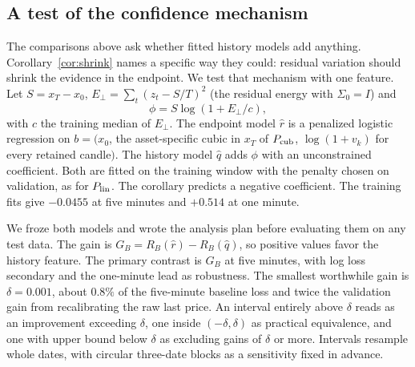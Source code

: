 \documentclass[runningheads]{llncs}
\begin{document}
\subsection{A test of the confidence mechanism}
\label{sec:confidence}
The comparisons above ask whether fitted history models add anything. Corollary~\ref{cor:shrink} names a specific way they could: residual variation should shrink the evidence in the endpoint. We test that mechanism with one feature. Let $S=x_T-x_0$, $E_\perp=\sum_t(z_t-S/T)^2$ (the residual energy with $\Sigma_0=I$) and
\[
 \phi=S\log(1+E_\perp/c),
\]
with $c$ the training median of $E_\perp$. The endpoint model $\widehat r$ is a penalized logistic regression on $b=(x_0$, the asset-specific cubic in $x_T$ of $P_{\rm cub}$, $\log(1+v_k)$ for every retained candle$)$. The history model $\widehat q$ adds $\phi$ with an unconstrained coefficient. Both are fitted on the training window with the penalty chosen on validation, as for $P_{\rm lin}$. The corollary predicts a negative coefficient. The training fits give $-0.0455$ at five minutes and $+0.514$ at one minute.

We froze both models and wrote the analysis plan before evaluating them on any test data. The gain is $G_B=R_B(\widehat r)-R_B(\widehat q)$, so positive values favor the history feature. The primary contrast is $G_B$ at five minutes, with log loss secondary and the one-minute lead as robustness. The smallest worthwhile gain is $\delta=0.001$, about $0.8\%$ of the five-minute baseline loss and twice the validation gain from recalibrating the raw last price. An interval entirely above $\delta$ reads as an improvement exceeding $\delta$, one inside $(-\delta,\delta)$ as practical equivalence, and one with upper bound below $\delta$ as excluding gains of $\delta$ or more. Intervals resample whole dates, with circular three-date blocks as a sensitivity fixed in advance.
\end{document}
